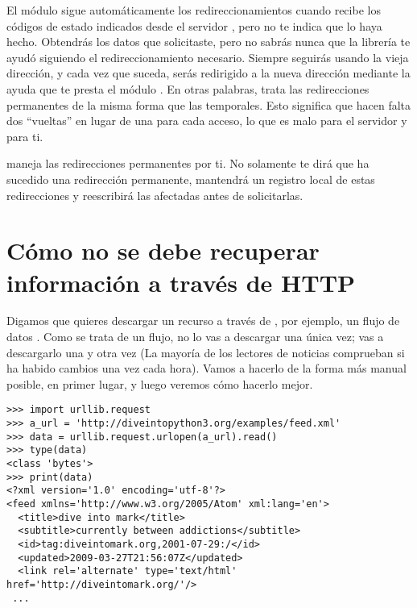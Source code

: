 El módulo  sigue automáticamente los redireccionamientos cuando recibe los códigos de estado indicados desde el servidor , pero no te indica que lo haya hecho. Obtendrás los datos que solicitaste, pero no sabrás nunca que la librería te ayudó siguiendo el redireccionamiento necesario. Siempre seguirás usando la vieja dirección, y cada vez que suceda, serás redirigido a la nueva dirección mediante la ayuda que te presta el módulo . En otras palabras, trata las redirecciones permanentes de la misma forma que las temporales. Esto significa que hacen falta dos ``vueltas'' en lugar de una para cada acceso, lo que es malo para el servidor y para ti.

 maneja las redirecciones permanentes por ti. No solamente te dirá que ha sucedido una redirección permanente, mantendrá un registro local de estas redirecciones y reescribirá las  afectadas antes de solicitarlas.

\section{Cómo no se debe recuperar información a través de HTTP}

Digamos que quieres descargar un recurso a través de , por ejemplo, un flujo de datos . Como se trata de un flujo, no lo vas a descargar una única vez; vas a descargarlo una y otra vez (La mayoría de los lectores de noticias comprueban si ha habido cambios una vez cada hora). Vamos a hacerlo de la forma más manual posible, en primer lugar, y luego veremos cómo hacerlo mejor.

\noindent\begin{minipage}{\textwidth}
\begin{lstlisting}[mathescape=False]
>>> import urllib.request
>>> a_url = 'http://diveintopython3.org/examples/feed.xml'
>>> data = urllib.request.urlopen(a_url).read()
>>> type(data)
<class 'bytes'>
>>> print(data)
<?xml version='1.0' encoding='utf-8'?>
<feed xmlns='http://www.w3.org/2005/Atom' xml:lang='en'>
  <title>dive into mark</title>
  <subtitle>currently between addictions</subtitle>
  <id>tag:diveintomark.org,2001-07-29:/</id>
  <updated>2009-03-27T21:56:07Z</updated>
  <link rel='alternate' type='text/html' href='http://diveintomark.org/'/>
 ... 
\end{lstlisting}
\end{minipage}

